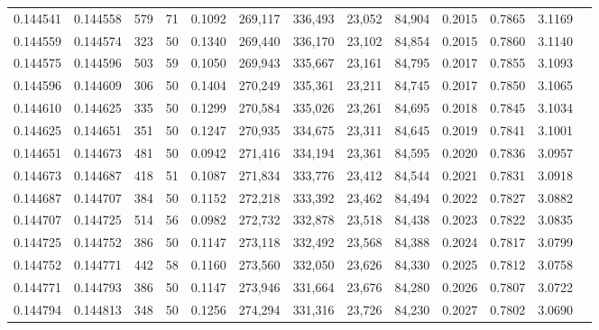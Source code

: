 \begin{tabular}{rrrrrrrrrrrrr}
0.144541 & 0.144558 &   579 &  71 &                                     0.1092 & 269,117 & 336,493 &  23,052 &  84,904 & 0.2015 & 0.7865 & 3.1169 \\
0.144559 & 0.144574 &   323 &  50 &                                     0.1340 & 269,440 & 336,170 &  23,102 &  84,854 & 0.2015 & 0.7860 & 3.1140 \\
0.144575 & 0.144596 &   503 &  59 &                                     0.1050 & 269,943 & 335,667 &  23,161 &  84,795 & 0.2017 & 0.7855 & 3.1093 \\
0.144596 & 0.144609 &   306 &  50 &                                     0.1404 & 270,249 & 335,361 &  23,211 &  84,745 & 0.2017 & 0.7850 & 3.1065 \\
0.144610 & 0.144625 &   335 &  50 &                                     0.1299 & 270,584 & 335,026 &  23,261 &  84,695 & 0.2018 & 0.7845 & 3.1034 \\
0.144625 & 0.144651 &   351 &  50 &                                     0.1247 & 270,935 & 334,675 &  23,311 &  84,645 & 0.2019 & 0.7841 & 3.1001 \\
0.144651 & 0.144673 &   481 &  50 &                                     0.0942 & 271,416 & 334,194 &  23,361 &  84,595 & 0.2020 & 0.7836 & 3.0957 \\
0.144673 & 0.144687 &   418 &  51 &                                     0.1087 & 271,834 & 333,776 &  23,412 &  84,544 & 0.2021 & 0.7831 & 3.0918 \\
0.144687 & 0.144707 &   384 &  50 &                                     0.1152 & 272,218 & 333,392 &  23,462 &  84,494 & 0.2022 & 0.7827 & 3.0882 \\
0.144707 & 0.144725 &   514 &  56 &                                     0.0982 & 272,732 & 332,878 &  23,518 &  84,438 & 0.2023 & 0.7822 & 3.0835 \\
0.144725 & 0.144752 &   386 &  50 &                                     0.1147 & 273,118 & 332,492 &  23,568 &  84,388 & 0.2024 & 0.7817 & 3.0799 \\
0.144752 & 0.144771 &   442 &  58 &                                     0.1160 & 273,560 & 332,050 &  23,626 &  84,330 & 0.2025 & 0.7812 & 3.0758 \\
0.144771 & 0.144793 &   386 &  50 &                                     0.1147 & 273,946 & 331,664 &  23,676 &  84,280 & 0.2026 & 0.7807 & 3.0722 \\
0.144794 & 0.144813 &   348 &  50 &                                     0.1256 & 274,294 & 331,316 &  23,726 &  84,230 & 0.2027 & 0.7802 & 3.0690 \\

\end{tabular}
